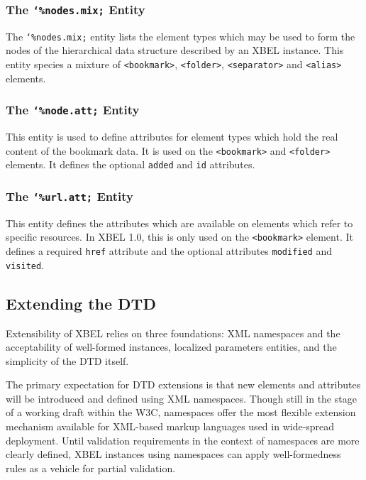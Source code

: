 \documentclass{howto}
\newcommand{\element}[1]{\texttt{<#1>}}
\newcommand{\attribute}[1]{\texttt{#1}}
\newcommand{\paramentity}[1]{\texttt{\char`\%#1;}}
\begin{document}
    \subsubsection{The \paramentity{nodes.mix} Entity
                   \label{entity-nodes.mix}}

      The \paramentity{nodes.mix} entity lists the element types which
      may be used to form the nodes of the hierarchical data structure
      described by an XBEL instance.  This entity species a mixture of
      \element{bookmark}, \element{folder}, \element{separator} and
      \element{alias} elements.

    \subsubsection{The \paramentity{node.att} Entity
                   \label{entity-node.att}}

      This entity is used to define attributes for element types which 
      hold the real content of the bookmark data.  It is used on the
      \element{bookmark} and \element{folder} elements.  It defines
      the optional \attribute{added} and \attribute{id} attributes.

    \subsubsection{The \paramentity{url.att} Entity
                   \label{entity-url.att}}

      This entity defines the attributes which are available on
      elements which refer to specific resources.  In XBEL 1.0, this
      is only used on the \element{bookmark} element.  It defines a
      required \attribute{href} attribute and the optional attributes
      \attribute{modified} and \attribute{visited}.

  \subsection{Extending the DTD
              \label{extending}}

    Extensibility of XBEL relies on three foundations: XML namespaces
    and the acceptability of well-formed instances, localized
    parameters entities, and the simplicity of the DTD itself.

    The primary expectation for DTD extensions is that new elements
    and attributes will be introduced and defined using XML
    namespaces.  Though still in the stage of a working draft within
    the W3C, namespaces offer the most flexible extension mechanism
    available for XML-based markup languages used in wide-spread
    deployment.  Until validation requirements in the context of
    namespaces are more clearly defined, XBEL instances using
    namespaces can apply well-formedness rules as a vehicle for
    partial validation.
\end{document}
